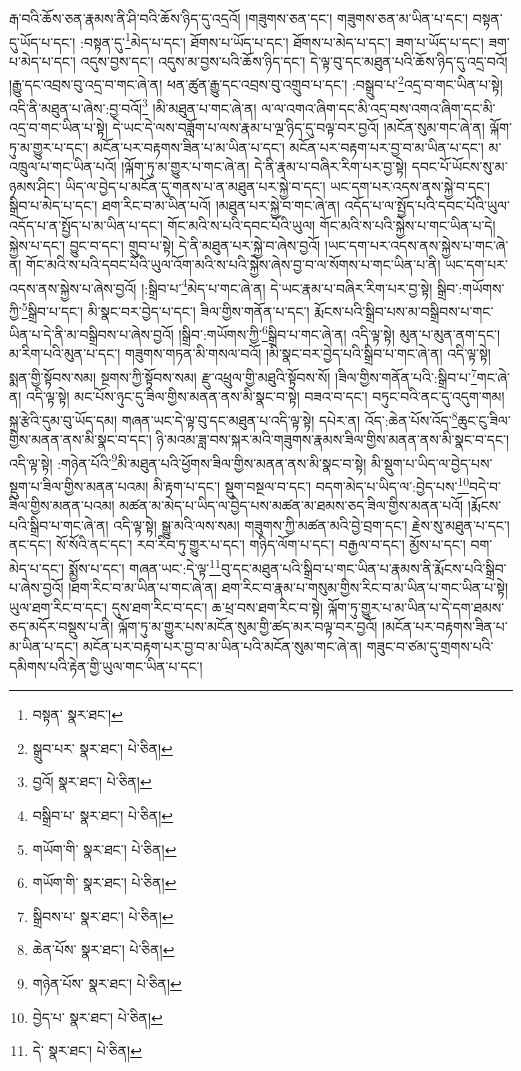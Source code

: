 རྒ་བའི་ཆོས་ཅན་རྣམས་ནི་ཤི་བའི་ཆོས་ཉིད་དུ་འདྲའོ། །གཟུགས་ཅན་དང་། གཟུགས་ཅན་མ་ཡིན་པ་དང་། བསྟན་དུ་ཡོད་པ་དང་། :བསྟན་དུ་\footnote{བསྟན་  སྣར་ཐང་། }མེད་པ་དང་། ཐོགས་པ་ཡོད་པ་དང་། ཐོགས་པ་མེད་པ་དང་། ཟག་པ་ཡོད་པ་དང་། ཟག་པ་མེད་པ་དང་། འདུས་བྱས་དང་། འདུས་མ་བྱས་པའི་ཆོས་ཉིད་དང་། དེ་ལྟ་བུ་དང་མཐུན་པའི་ཆོས་ཉིད་དུ་འདྲ་བའོ། །རྒྱུ་དང་འབྲས་བུ་འདྲ་བ་གང་ཞེ་ན། ཕན་ཚུན་རྒྱུ་དང་འབྲས་བུ་འགྲུབ་པ་དང་། :བསྒྲུབ་པ་\footnote{སྒྲུབ་པར་  སྣར་ཐང་།  པེ་ཅིན། }འདྲ་བ་གང་ཡིན་པ་སྟེ། འདི་ནི་མཐུན་པ་ཞེས་:བྱ་བའོ།\footnote{བྱའོ།  སྣར་ཐང་།  པེ་ཅིན། } །མི་མཐུན་པ་གང་ཞེ་ན། ལ་ལ་འགའ་ཞིག་དང་མི་འདྲ་བས་འགའ་ཞིག་དང་མི་འདྲ་བ་གང་ཡིན་པ་སྟེ། དེ་ཡང་དེ་ལས་བཟློག་པ་ལས་རྣམ་པ་ལྔ་ཉིད་དུ་བལྟ་བར་བྱའོ། །མངོན་སུམ་གང་ཞེ་ན། ལྐོག་ཏུ་མ་གྱུར་པ་དང་། མངོན་པར་བརྟགས་ཟིན་པ་མ་ཡིན་པ་དང་། མངོན་པར་བརྟག་པར་བྱ་བ་མ་ཡིན་པ་དང་། མ་འཁྲུལ་པ་གང་ཡིན་པའོ། །ལྐོག་ཏུ་མ་གྱུར་པ་གང་ཞེ་ན། དེ་ནི་རྣམ་པ་བཞིར་རིག་པར་བྱ་སྟེ། དབང་པོ་ཡོངས་སུ་མ་ཉམས་ཤིང་། ཡིད་ལ་བྱེད་པ་མངོན་དུ་གནས་པ་ན་མཐུན་པར་སྐྱེ་བ་དང་། ཡང་དག་པར་འདས་ནས་སྐྱེ་བ་དང་། སྒྲིབ་པ་མེད་པ་དང་། ཐག་རིང་བ་མ་ཡིན་པའོ། །མཐུན་པར་སྐྱེ་བ་གང་ཞེ་ན། འདོད་པ་ལ་སྤྱོད་པའི་དབང་པོའི་ཡུལ་འདོད་པ་ན་སྤྱོད་པ་མ་ཡིན་པ་དང་། གོང་མའི་ས་པའི་དབང་པོའི་ཡུལ། གོང་མའི་ས་པའི་སྐྱེས་པ་གང་ཡིན་པ་དེ། སྐྱེས་པ་དང་། བྱུང་བ་དང་། གྲུབ་པ་སྟེ། དེ་ནི་མཐུན་པར་སྐྱེ་བ་ཞེས་བྱའོ། །ཡང་དག་པར་འདས་ནས་སྐྱེས་པ་གང་ཞེ་ན། གོང་མའི་ས་པའི་དབང་པོའི་ཡུལ་འོག་མའི་ས་པའི་སྐྱེས་ཞེས་བྱ་བ་ལ་སོགས་པ་གང་ཡིན་པ་ནི། ཡང་དག་པར་འདས་ནས་སྐྱེས་པ་ཞེས་བྱའོ། །:སྒྲིབ་པ་\footnote{བསྒྲིབ་པ་  སྣར་ཐང་།  པེ་ཅིན། }མེད་པ་གང་ཞེ་ན། དེ་ཡང་རྣམ་པ་བཞིར་རིག་པར་བྱ་སྟེ། སྒྲིབ་:གཡོགས་ཀྱི་\footnote{གཡོག་གི་  སྣར་ཐང་།  པེ་ཅིན། }སྒྲིབ་པ་དང་། མི་སྣང་བར་བྱེད་པ་དང་། ཟིལ་གྱིས་གནོན་པ་དང་། རྨོངས་པའི་སྒྲིབ་པས་མ་བསྒྲིབས་པ་གང་ཡིན་པ་དེ་ནི་མ་བསྒྲིབས་པ་ཞེས་བྱའོ། །སྒྲིབ་:གཡོགས་ཀྱི་\footnote{གཡོག་གི་  སྣར་ཐང་།  པེ་ཅིན། }སྒྲིབ་པ་གང་ཞེ་ན། འདི་ལྟ་སྟེ། མུན་པ་མུན་ནག་དང་། མ་རིག་པའི་མུན་པ་དང་། གཟུགས་གཏན་མི་གསལ་བའོ། །མི་སྣང་བར་བྱེད་པའི་སྒྲིབ་པ་གང་ཞེ་ན། འདི་ལྟ་སྟེ། སྨན་གྱི་སྟོབས་སམ། སྔགས་ཀྱི་སྟོབས་སམ། རྫུ་འཕྲུལ་གྱི་མཐུའི་སྟོབས་སོ། །ཟིལ་གྱིས་གནོན་པའི་:སྒྲིབ་པ་\footnote{སྒྲིབས་པ་  སྣར་ཐང་།  པེ་ཅིན། }གང་ཞེ་ན། འདི་ལྟ་སྟེ། མང་པོས་ཉུང་དུ་ཟིལ་གྱིས་མནན་ནས་མི་སྣང་བ་སྟེ། བཟའ་བ་དང་། བཏུང་བའི་ནང་དུ་འདུག་གམ། སྐྲ་རྩེའི་དུམ་བུ་ཡོད་དམ། གཞན་ཡང་དེ་ལྟ་བུ་དང་མཐུན་པ་འདི་ལྟ་སྟེ། དཔེར་ན། འོད་:ཆེན་པོས་འོད་\footnote{ཆེན་པོས་  སྣར་ཐང་།  པེ་ཅིན། }ཆུང་ངུ་ཟིལ་གྱིས་མནན་ནས་མི་སྣང་བ་དང་། ཉི་མའམ་ཟླ་བས་སྐར་མའི་གཟུགས་རྣམས་ཟིལ་གྱིས་མནན་ནས་མི་སྣང་བ་དང་། འདི་ལྟ་སྟེ། :གཉེན་པོའི་\footnote{གཉེན་པོས་  སྣར་ཐང་།  པེ་ཅིན། }མི་མཐུན་པའི་ཕྱོགས་ཟིལ་གྱིས་མནན་ནས་མི་སྣང་བ་སྟེ། མི་སྡུག་པ་ཡིད་ལ་བྱེད་པས་སྡུག་པ་ཟིལ་གྱིས་མནན་པའམ། མི་རྟག་པ་དང་། སྡུག་བསྔལ་བ་དང་། བདག་མེད་པ་ཡིད་ལ་:བྱེད་པས་\footnote{བྱེད་པ་  སྣར་ཐང་།  པེ་ཅིན། }བདེ་བ་ཟིལ་གྱིས་མནན་པའམ། མཚན་མ་མེད་པ་ཡིད་ལ་བྱེད་པས་མཚན་མ་ཐམས་ཅད་ཟིལ་གྱིས་མནན་པའོ། །རྨོངས་པའི་སྒྲིབ་པ་གང་ཞེ་ན། འདི་ལྟ་སྟེ། སྒྱུ་མའི་ལས་སམ། གཟུགས་ཀྱི་མཚན་མའི་བྱེ་བྲག་དང་། རྗེས་སུ་མཐུན་པ་དང་། ནང་དང་། སོ་སོའི་ནང་དང་། རབ་རིབ་ཏུ་གྱུར་པ་དང་། གཉིད་ལོག་པ་དང་། བརྒྱལ་བ་དང་། མྱོས་པ་དང་། བག་མེད་པ་དང་། སྨྱོས་པ་དང་། གཞན་ཡང་:དེ་ལྟ་\footnote{དེ་  སྣར་ཐང་།  པེ་ཅིན། }བུ་དང་མཐུན་པའི་སྒྲིབ་པ་གང་ཡིན་པ་རྣམས་ནི་རྨོངས་པའི་སྒྲིབ་པ་ཞེས་བྱའོ། །ཐག་རིང་བ་མ་ཡིན་པ་གང་ཞེ་ན། ཐག་རིང་བ་རྣམ་པ་གསུམ་གྱིས་རིང་བ་མ་ཡིན་པ་གང་ཡིན་པ་སྟེ། ཡུལ་ཐག་རིང་བ་དང་། དུས་ཐག་རིང་བ་དང་། ཆ་ཕྲ་བས་ཐག་རིང་བ་སྟེ། ལྐོག་ཏུ་གྱུར་པ་མ་ཡིན་པ་དེ་དག་ཐམས་ཅད་མདོར་བསྡུས་པ་ནི། ལྐོག་ཏུ་མ་གྱུར་པས་མངོན་སུམ་གྱི་ཚད་མར་བལྟ་བར་བྱའོ། །མངོན་པར་བརྟགས་ཟིན་པ་མ་ཡིན་པ་དང་། མངོན་པར་བརྟག་པར་བྱ་བ་མ་ཡིན་པའི་མངོན་སུམ་གང་ཞེ་ན། གཟུང་བ་ཙམ་དུ་གྲགས་པའི་དམིགས་པའི་རྟེན་གྱི་ཡུལ་གང་ཡིན་པ་དང་། 